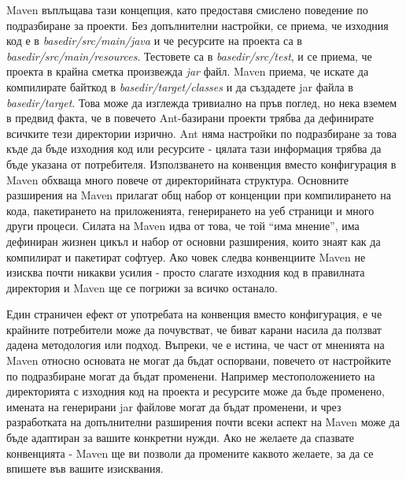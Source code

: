 Maven въплъщава тази концепция, като предоставя смислено поведение по
подразбиране за проекти. Без допълнителни настройки, се приема, че
изходния код е в \emph{basedir/src/main/java} и че ресурсите на
проекта са в \emph{basedir/src/main/resources}. Тестовете са в
\emph{basedir/src/test}, и се приема, че проекта в крайна сметка
произвежда \emph{jar} файл. Maven приема, че искате да компилирате
байткод в \emph{basedir/target/classes} и да създадете jar файла в
\emph{basedir/target}. Това може да изглежда тривиално на пръв поглед,
но нека вземем в предвид факта, че в повечето Ant-базирани проекти
трябва да дефинирате всичките тези директории изрично. Ant няма настройки по
подразбиране за това къде да бъде изходния код или ресурсите - цялата
тази информация трябва да бъде указана от потребителя. Използването на
конвенция вместо конфигурация в Maven обхваща много повече от
директорийната структура. Основните разширения на Maven прилагат общ
набор от конценции при компилирането на кода, пакетирането на
приложенията, генерирането на уеб страници и много други
процеси. Силата на Maven идва от това, че той "`има мнение"', има
дефиниран жизнен цикъл и набор от основни разширения, които знаят как
да компилират и пакетират софтуер. Ако човек следва конвенциите Maven
не изисква почти никакви усилия - просто слагате изходния код в
правилната директория и Maven ще се погрижи за всичко останало.

Един страничен ефект от употребата на конвенция вместо конфигурация, е
че крайните потребители може да почувстват, че биват карани насила да
ползват дадена методология или подход. Въпреки, че е истина, че част
от мненията на Maven относно основата не могат да бъдат оспорвани,
повечето от настройките по подразбиране могат да бъдат
променени. Например местоположението на директорията с изходния код на
проекта и ресурсите може да бъде променено, имената на генерирани jar
файлове могат да бъдат променени, и чрез разработката на допълнителни
разширения почти всеки аспект на Maven може да бъде адаптиран за
вашите конкретни нужди. Ако не желаете да спазвате конвенцията - Maven
ще ви позволи да промените каквото желаете, за да се впишете във
вашите изисквания. 
